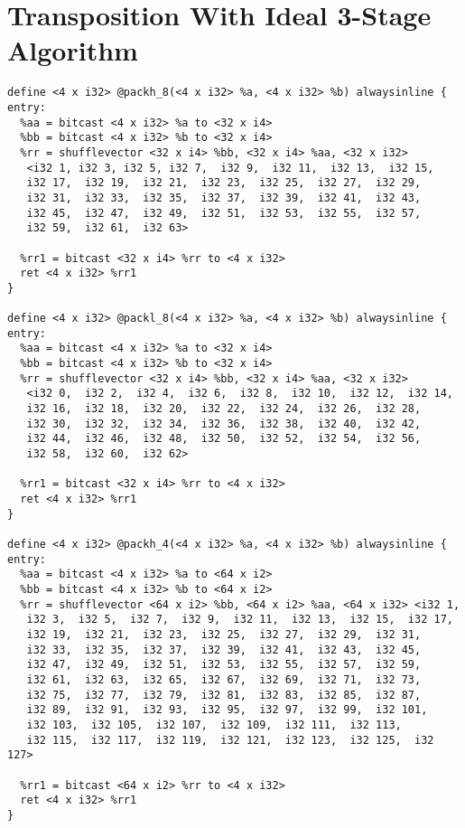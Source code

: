 \section{Transposition With Ideal 3-Stage Algorithm}
\label{appone:transposition_ideal}
\begin{lstlisting}
define <4 x i32> @packh_8(<4 x i32> %a, <4 x i32> %b) alwaysinline {
entry:
  %aa = bitcast <4 x i32> %a to <32 x i4>
  %bb = bitcast <4 x i32> %b to <32 x i4>
  %rr = shufflevector <32 x i4> %bb, <32 x i4> %aa, <32 x i32>
   <i32 1, i32 3, i32 5, i32 7,  i32 9,  i32 11,  i32 13,  i32 15,
   i32 17,  i32 19,  i32 21,  i32 23,  i32 25,  i32 27,  i32 29,
   i32 31,  i32 33,  i32 35,  i32 37,  i32 39,  i32 41,  i32 43,
   i32 45,  i32 47,  i32 49,  i32 51,  i32 53,  i32 55,  i32 57,
   i32 59,  i32 61,  i32 63>

  %rr1 = bitcast <32 x i4> %rr to <4 x i32>
  ret <4 x i32> %rr1
}

define <4 x i32> @packl_8(<4 x i32> %a, <4 x i32> %b) alwaysinline {
entry:
  %aa = bitcast <4 x i32> %a to <32 x i4>
  %bb = bitcast <4 x i32> %b to <32 x i4>
  %rr = shufflevector <32 x i4> %bb, <32 x i4> %aa, <32 x i32>
   <i32 0,  i32 2,  i32 4,  i32 6,  i32 8,  i32 10,  i32 12,  i32 14,
   i32 16,  i32 18,  i32 20,  i32 22,  i32 24,  i32 26,  i32 28,
   i32 30,  i32 32,  i32 34,  i32 36,  i32 38,  i32 40,  i32 42,
   i32 44,  i32 46,  i32 48,  i32 50,  i32 52,  i32 54,  i32 56,
   i32 58,  i32 60,  i32 62>

  %rr1 = bitcast <32 x i4> %rr to <4 x i32>
  ret <4 x i32> %rr1
}

define <4 x i32> @packh_4(<4 x i32> %a, <4 x i32> %b) alwaysinline {
entry:
  %aa = bitcast <4 x i32> %a to <64 x i2>
  %bb = bitcast <4 x i32> %b to <64 x i2>
  %rr = shufflevector <64 x i2> %bb, <64 x i2> %aa, <64 x i32> <i32 1,
   i32 3,  i32 5,  i32 7,  i32 9,  i32 11,  i32 13,  i32 15,  i32 17,
   i32 19,  i32 21,  i32 23,  i32 25,  i32 27,  i32 29,  i32 31,
   i32 33,  i32 35,  i32 37,  i32 39,  i32 41,  i32 43,  i32 45,
   i32 47,  i32 49,  i32 51,  i32 53,  i32 55,  i32 57,  i32 59,
   i32 61,  i32 63,  i32 65,  i32 67,  i32 69,  i32 71,  i32 73,
   i32 75,  i32 77,  i32 79,  i32 81,  i32 83,  i32 85,  i32 87,
   i32 89,  i32 91,  i32 93,  i32 95,  i32 97,  i32 99,  i32 101,
   i32 103,  i32 105,  i32 107,  i32 109,  i32 111,  i32 113,
   i32 115,  i32 117,  i32 119,  i32 121,  i32 123,  i32 125,  i32 127>

  %rr1 = bitcast <64 x i2> %rr to <4 x i32>
  ret <4 x i32> %rr1
}


\end{lstlisting}
